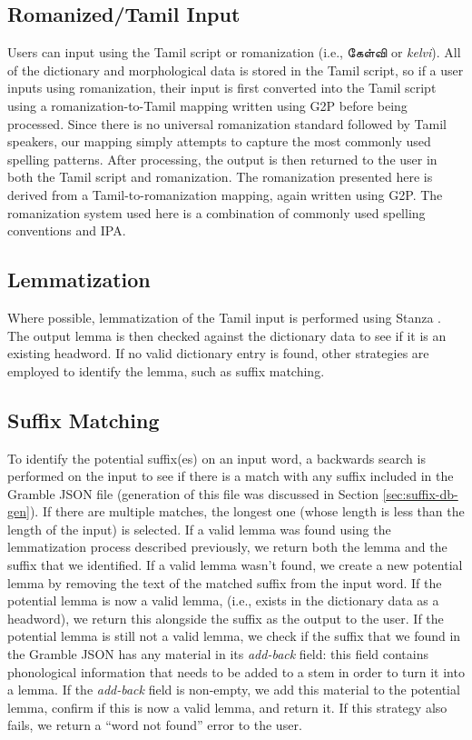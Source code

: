 \documentclass[11pt]{article}
\begin{document}
\subsection{Romanized/Tamil Input} \label{sec:romanization}
Users can input using the Tamil script or romanization (i.e., \foreignlanguage{tamil}{கேள்வி} or \textit{kelvi}). 
All of the dictionary and morphological data is stored in the Tamil script, 
so if a user inputs using romanization, their input is first converted into 
the Tamil script using a romanization-to-Tamil mapping written using 
G2P \citep{pine_gi2pi_2022} before being processed. 
Since there is no universal romanization standard followed by Tamil speakers, 
our mapping simply attempts to capture the most commonly used spelling patterns. 
After processing, the output is then returned to the user in both the 
Tamil script and romanization. The romanization presented here is derived 
from a Tamil-to-romanization mapping, again written using G2P. 
The romanization system used here is a combination of commonly used 
spelling conventions and IPA.

\subsection{Lemmatization}
Where possible, lemmatization of the Tamil input is performed using 
Stanza \citep{qi2020stanza}. The output lemma is then checked 
against the dictionary data to see if it is an existing headword. 
If no valid dictionary entry is found, other strategies are 
employed to identify the lemma, such as suffix matching.

\subsection{Suffix Matching} \label{sec:suffix-matching}
To identify the potential suffix(es) on an input word, a backwards 
search is performed on the input to see if there is a match with 
any suffix included in the Gramble JSON file (generation of this file was discussed in Section \ref{sec:suffix-db-gen}). If there are multiple matches, 
the longest one (whose length is less than the length of the input) is 
selected. If a valid lemma was found using the lemmatization process 
described previously, we return both the lemma and the suffix that 
we identified. If a valid lemma wasn’t found, we create a new potential 
lemma by removing the text of the matched suffix from the input word. 
If the potential lemma is now a valid lemma, (i.e., exists in the 
dictionary data as a headword), we return this alongside the suffix 
as the output to the user. If the potential lemma is still not a valid 
lemma, we check if the suffix that we found in the Gramble JSON has any 
material in its \textit{add-back} field: this field contains phonological 
information that needs to be added to a stem in order to turn it into a lemma. 
If the \textit{add-back} field is non-empty, we add this material 
to the potential lemma, confirm if this is now a valid lemma, 
and return it. If this strategy also fails, we return a “word not found” error to the user.
\end{document}
